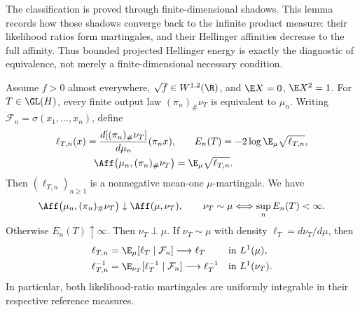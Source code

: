 The classification is proved through finite-dimensional shadows.
This lemma records how those shadows converge back to the infinite product
measure: their likelihood ratios form martingales, and their Hellinger
affinities decrease to the full affinity.
Thus bounded projected Hellinger energy is exactly the diagnostic of
equivalence, not merely a finite-dimensional necessary condition.

\begin{lemma}
\label{lem:finite-marginal-likelihood-ratios}
Assume \(f>0\) almost everywhere, \(\sqrt f\in W^{1,2}(\R)\),
and \(\E X=0\), \(\E X^2=1\).
For \(T\in\GL(H)\), every finite output law
\((\pi_n)_\#\nu_T\) is equivalent to \(\mu_n\).
Writing \(\mathcal F_n=\sigma(x_1,\ldots,x_n)\), define
\begin{equation}
 \begin{aligned}
  \ell_{T,n}(x)=\frac{d[(\pi_n)_\#\nu_T]}{d\mu_n}(\pi_n x),
  &\qquad E_n(T)=-2\log\E_\mu\sqrt{\ell_{T,n}},\\
  \Aff\bigl(\mu_n,(\pi_n)_\#\nu_T\bigr)
  &=\E_\mu\sqrt{\ell_{T,n}}.
 \end{aligned}
  \label{eq:finite-marginal-likelihood-ratios}
\end{equation}
Then \((\ell_{T,n})_{n\geq1}\) is a nonnegative mean-one
\(\mu\)-martingale.
We have
\begin{equation}
  \Aff\bigl(\mu_n,(\pi_n)_\#\nu_T\bigr)\downarrow\Aff(\mu,\nu_T),
  \qquad
  \nu_T\sim\mu
    \Longleftrightarrow\sup_nE_n(T)<\infty.
  \label{eq:marginal-affinity-limit}
\end{equation}
Otherwise \(E_n(T)\uparrow\infty\).
Then \(\nu_T\perp\mu\).
If \(\nu_T\sim\mu\) with density
\(\ell_T=d\nu_T/d\mu\), then
\begin{align}
  \ell_{T,n}&=\E_\mu[\ell_T\mid\mathcal F_n]
       \longrightarrow \ell_T
       &&\text{in }L^1(\mu),
       \label{eq:forward-likelihood-ui}\\
  \ell_{T,n}^{-1}&=\E_{\nu_T}[\ell_T^{-1}\mid\mathcal F_n]
       \longrightarrow \ell_T^{-1}
       &&\text{in }L^1(\nu_T).
       \label{eq:reverse-likelihood-ui}
\end{align}
In particular, both likelihood-ratio martingales are uniformly integrable in
their respective reference measures.
\end{lemma}

